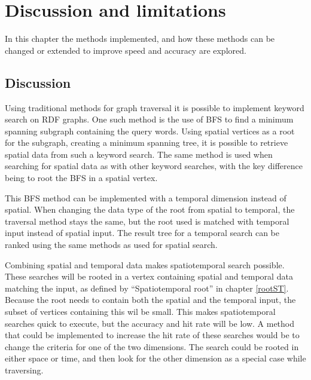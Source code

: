 \chapter{Discussion and limitations}
\label{cha:Discussion}
In this chapter the methods implemented, and how these methods can be changed or extended to improve speed and accuracy are explored.

% 
% 
\section{Discussion}
\label{sec:Discussion}
Using traditional methods for graph traversal it is possible to implement keyword search on RDF graphs. One such method is the use of BFS to find a minimum spanning subgraph containing the query words. Using spatial vertices as a root for the subgraph, creating a minimum spanning tree, it is possible to retrieve spatial data from such a keyword search. The same method is used when searching for spatial data as with other keyword searches, with the key difference being to root the BFS in a spatial vertex.

This BFS method can be implemented with a temporal dimension instead of spatial. When changing the data type of the root from spatial to temporal, the traversal method stays the same, but the root used is matched with temporal input instead of spatial input. The result tree for a temporal search can be ranked using the same methods as used for spatial search.

Combining spatial and temporal data makes spatiotemporal search possible. These searches will be rooted in a vertex containing spatial and temporal data matching the input, as defined by ``Spatiotemporal root'' in chapter \ref{rootST}. Because the root needs to contain both the spatial and the temporal input, the subset of vertices containing this wil be small. This makes spatiotemporal searches quick to execute, but the accuracy and hit rate will be low. A method that could be implemented to increase the hit rate of these searches would be to change the criteria for one of the two dimensions. The search could be rooted in either space or time, and then look for the other dimension as a special case while traversing.


